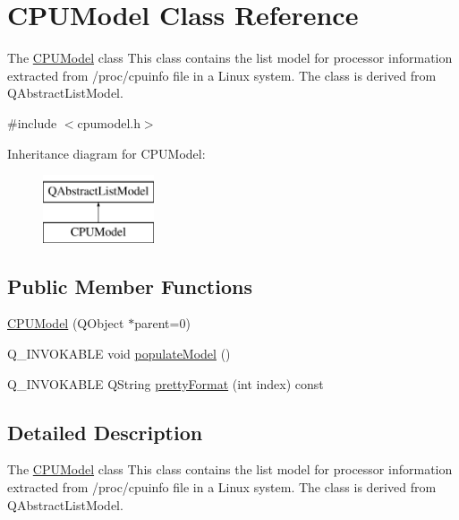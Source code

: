 \hypertarget{class_c_p_u_model}{}\section{C\+P\+U\+Model Class Reference}
\label{class_c_p_u_model}


The \hyperlink{class_c_p_u_model}{C\+P\+U\+Model} class This class contains the list model for processor information extracted from \textquotesingle{}/proc/cpuinfo\textquotesingle{} file in a Linux system. The class is derived from Q\+Abstract\+List\+Model.  




{\ttfamily \#include $<$cpumodel.\+h$>$}

Inheritance diagram for C\+P\+U\+Model\+:\begin{figure}[H]
\begin{center}
\leavevmode
\includegraphics[height=2.000000cm]{class_c_p_u_model}
\end{center}
\end{figure}
\subsection*{Public Member Functions}
\begin{DoxyCompactItemize}
\item 
\hyperlink{class_c_p_u_model_aecf961723e84bc4d1782d2ecc2228e3d}{C\+P\+U\+Model} (Q\+Object $\ast$parent=0)
\item 
Q\+\_\+\+I\+N\+V\+O\+K\+A\+B\+LE void \hyperlink{class_c_p_u_model_a5d940e548d8e38476161a86f92a76aeb}{populate\+Model} ()
\item 
Q\+\_\+\+I\+N\+V\+O\+K\+A\+B\+LE Q\+String \hyperlink{class_c_p_u_model_a69b8398765d4e00e7394ddc1cf83b663}{pretty\+Format} (int index) const
\end{DoxyCompactItemize}


\subsection{Detailed Description}
The \hyperlink{class_c_p_u_model}{C\+P\+U\+Model} class This class contains the list model for processor information extracted from \textquotesingle{}/proc/cpuinfo\textquotesingle{} file in a Linux system. The class is derived from Q\+Abstract\+List\+Model. 

